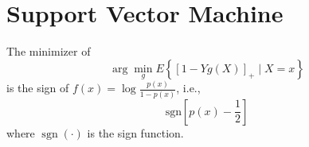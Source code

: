 \chapter{Support Vector Machine}

\begin{theorem}
    The minimizer of
    \begin{equation*}
        \arg\min_{g} E\left\{\left[1-Yg(X)\right]_{+}\mid X=x\right\}
    \end{equation*}
    is the sign of $f(x)=\log\frac{p(x)}{1-p(x)}$, i.e.,
    \begin{equation*}
        \text{sgn}\left[p(x)-\frac{1}{2}\right]
    \end{equation*}
    where $\operatorname{sgn}(\cdot)$ is the sign function.
\end{theorem}

